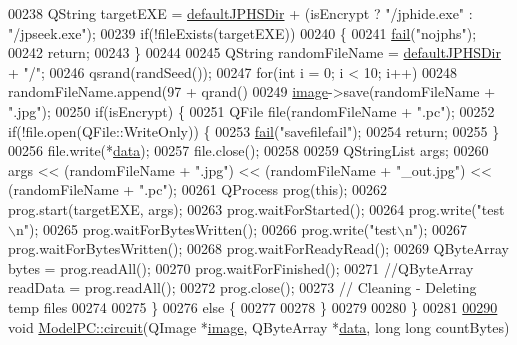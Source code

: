 \begin{DoxyCode}
00238     QString targetEXE = \mbox{\hyperlink{class_model_p_c_abd038306f14f22fb885a1697c96d6335}{defaultJPHSDir}} + (isEncrypt ? \textcolor{stringliteral}{"/jphide.exe"} : \textcolor{stringliteral}{"/jpseek.exe"});
00239     \textcolor{keywordflow}{if}(!fileExists(targetEXE))
00240     \{
00241         \mbox{\hyperlink{class_model_p_c_a47464b59b7e37fcee25e55475708aabd}{fail}}(\textcolor{stringliteral}{"nojphs"});
00242         \textcolor{keywordflow}{return};
00243     \}
00244 
00245     QString randomFileName = \mbox{\hyperlink{class_model_p_c_abd038306f14f22fb885a1697c96d6335}{defaultJPHSDir}} + \textcolor{stringliteral}{"/"};
00246     qsrand(randSeed());
00247     \textcolor{keywordflow}{for}(\textcolor{keywordtype}{int} i = 0; i < 10; i++)
00248         randomFileName.append(97 + qrand() %
00249     \mbox{\hyperlink{namespacetests-setup_ad55b685280f549e15688a94cbb89f512}{image}}->save(randomFileName + \textcolor{stringliteral}{".jpg"});
00250     \textcolor{keywordflow}{if}(isEncrypt) \{
00251         QFile file(randomFileName + \textcolor{stringliteral}{".pc"});
00252         \textcolor{keywordflow}{if}(!file.open(QFile::WriteOnly)) \{
00253             \mbox{\hyperlink{class_model_p_c_a47464b59b7e37fcee25e55475708aabd}{fail}}(\textcolor{stringliteral}{"savefilefail"});
00254             \textcolor{keywordflow}{return};
00255         \}
00256         file.write(*\mbox{\hyperlink{namespace_errors_dict_setup_af570460846fb9f0c91abd308a095dcdc}{data}});
00257         file.close();
00258 
00259         QStringList args;
00260         args << (randomFileName + \textcolor{stringliteral}{".jpg"}) << (randomFileName + \textcolor{stringliteral}{"\_out.jpg"}) << (randomFileName + \textcolor{stringliteral}{".pc"});
00261         QProcess prog(\textcolor{keyword}{this});
00262         prog.start(targetEXE, args);
00263         prog.waitForStarted();
00264         prog.write(\textcolor{stringliteral}{"test\(\backslash\)n"});
00265         prog.waitForBytesWritten();
00266         prog.write(\textcolor{stringliteral}{"test\(\backslash\)n"});
00267         prog.waitForBytesWritten();
00268         prog.waitForReadyRead();
00269         QByteArray bytes = prog.readAll();
00270         prog.waitForFinished();
00271         \textcolor{comment}{//QByteArray readData = prog.readAll();}
00272         prog.close();
00273         \textcolor{comment}{// Cleaning - Deleting temp files}
00274 
00275     \}
00276     \textcolor{keywordflow}{else} \{
00277 
00278     \}
00279 
00280 \}
00281 
\mbox{\hyperlink{class_model_p_c_a1d0091062a0c836b283ec2f67411623b}{00290}} \textcolor{keywordtype}{void} \mbox{\hyperlink{class_model_p_c_a1d0091062a0c836b283ec2f67411623b}{ModelPC::circuit}}(QImage *\mbox{\hyperlink{namespacetests-setup_ad55b685280f549e15688a94cbb89f512}{image}}, QByteArray *\mbox{\hyperlink{namespace_errors_dict_setup_af570460846fb9f0c91abd308a095dcdc}{data}}, \textcolor{keywordtype}{long} \textcolor{keywordtype}{long} countBytes)

\end{DoxyCode}
